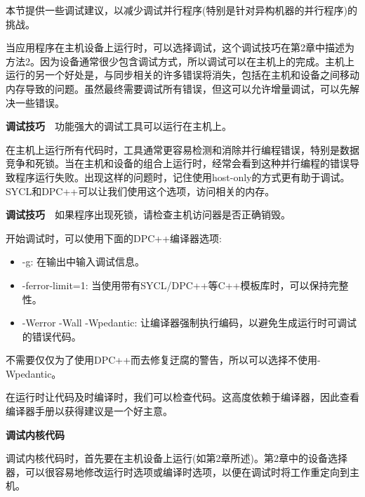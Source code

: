 本节提供一些调试建议，以减少调试并行程序(特别是针对异构机器的并行程序)的挑战。\par

当应用程序在主机设备上运行时，可以选择调试，这个调试技巧在第2章中描述为方法2。因为设备通常很少包含调试方式，所以调试可以在主机上的完成。主机上运行的另一个好处是，与同步相关的许多错误将消失，包括在主机和设备之间移动内存导致的问题。虽然最终需要调试所有错误，但这可以允许增量调试，可以先解决一些错误。\par

\begin{tcolorbox}[colback=red!5!white,colframe=red!75!black]
\textbf{调试技巧} 功能强大的调试工具可以运行在主机上。
\end{tcolorbox}

在主机上运行所有代码时，工具通常更容易检测和消除并行编程错误，特别是数据竞争和死锁。当在主机和设备的组合上运行时，经常会看到这种并行编程的错误导致程序运行失败。出现这样的问题时，记住使用host-only的方式更有助于调试。SYCL和DPC++可以让我们使用这个选项，访问相关的内存。\par

\begin{tcolorbox}[colback=red!5!white,colframe=red!75!black]
\textbf{调试技巧} 如果程序出现死锁，请检查主机访问器是否正确销毁。
\end{tcolorbox}

开始调试时，可以使用下面的DPC++编译器选项:\par

\begin{itemize}
	\item -g: 在输出中输入调试信息。
	\item -ferror-limit=1: 当使用带有SYCL/DPC++等C++模板库时，可以保持完整性。
	\item -Werror -Wall -Wpedantic: 让编译器强制执行编码，以避免生成运行时可调试的错误代码。
\end{itemize}

不需要仅仅为了使用DPC++而去修复迂腐的警告，所以可以选择不使用-Wpedantic。\par

在运行时让代码及时编译时，我们可以检查代码。这高度依赖于编译器，因此查看编译器手册以获得建议是一个好主意。\par

\hspace*{\fill} \par %
\textbf{调试内核代码}

调试内核代码时，首先要在主机设备上运行(如第2章所述)。第2章中的设备选择器，可以很容易地修改运行时选项或编译时选项，以便在调试时将工作重定向到主机。\par


